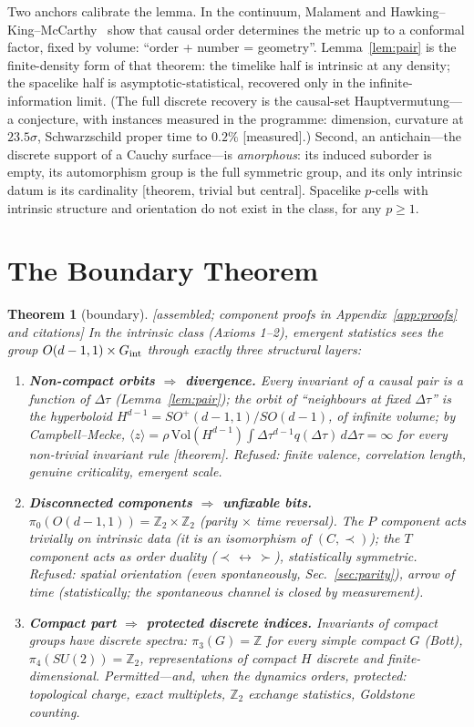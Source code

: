 \documentclass[aps,prd,reprint,nofootinbib,superscriptaddress,floatfix]{revtex4-2}
\newtheorem{theorem}{Theorem}
\theoremstyle{definition}
\begin{document}
Two anchors calibrate the lemma. In the continuum, Malament and
Hawking--King--McCarthy~\cite{Malament1977,HKM1976} show that causal order determines
the metric up to a conformal factor, fixed by volume: ``order + number = geometry''.
Lemma~\ref{lem:pair} is the finite-density form of that theorem: the timelike half is
intrinsic at any density; the spacelike half is asymptotic-statistical, recovered only
in the infinite-information limit. (The full discrete recovery is the causal-set
Hauptvermutung---a conjecture, with instances measured in the programme: dimension,
curvature at $23.5\sigma$, Schwarzschild proper time to $0.2\%$ [measured].) Second, an
antichain---the discrete support of a Cauchy surface---is \emph{amorphous}: its induced
suborder is empty, its automorphism group is the full symmetric group, and its only
intrinsic datum is its cardinality [theorem, trivial but central]. Spacelike $p$-cells
with intrinsic structure and orientation do not exist in the class, for any $p\ge1$.

\section{The Boundary Theorem}
\label{sec:boundary}

\begin{theorem}[boundary]
\label{thm:boundary}
{\rm[assembled; component proofs in Appendix~\ref{app:proofs} and citations]} In the
intrinsic class (Axioms 1--2), emergent
statistics sees the group $O(d-1,1)\times G_{\rm int}$ through exactly three structural
layers:
\begin{enumerate}
\item \textbf{Non-compact orbits $\Rightarrow$ divergence.} Every invariant of a causal
pair is a function of $\Delta\tau$ (Lemma~\ref{lem:pair}); the orbit of ``neighbours at
fixed $\Delta\tau$'' is the hyperboloid $H^{d-1}=SO^{+}(d-1,1)/SO(d-1)$, of infinite
volume; by Campbell--Mecke,
$\langle z\rangle=\rho\,\mathrm{Vol}(H^{d-1})\int\Delta\tau^{d-1}q(\Delta\tau)\,
d\Delta\tau=\infty$ for every non-trivial invariant rule [theorem]. Refused: finite
valence, correlation length, genuine criticality, emergent scale.
\item \textbf{Disconnected components $\Rightarrow$ unfixable bits.}
$\pi_0(O(d-1,1))=\mathbb{Z}_2\times\mathbb{Z}_2$ (parity $\times$ time reversal). The
$P$ component acts \emph{trivially} on intrinsic data (it is an isomorphism of
$(C,\prec)$); the $T$ component acts as \emph{order duality} ($\prec\,\leftrightarrow\,
\succ$), statistically symmetric. Refused: spatial orientation (even spontaneously,
Sec.~\ref{sec:parity}), arrow of time (statistically; the spontaneous channel is closed
by measurement).
\item \textbf{Compact part $\Rightarrow$ protected discrete indices.} Invariants of
compact groups have discrete spectra: $\pi_3(G)=\mathbb{Z}$ for every simple compact $G$
(Bott), $\pi_4(SU(2))=\mathbb{Z}_2$, representations of compact $H$ discrete and
finite-dimensional. Permitted---and, when the dynamics orders, protected: topological
charge, exact multiplets, $\mathbb{Z}_2$ exchange statistics, Goldstone counting.
\end{enumerate}
\end{theorem}
\end{document}
